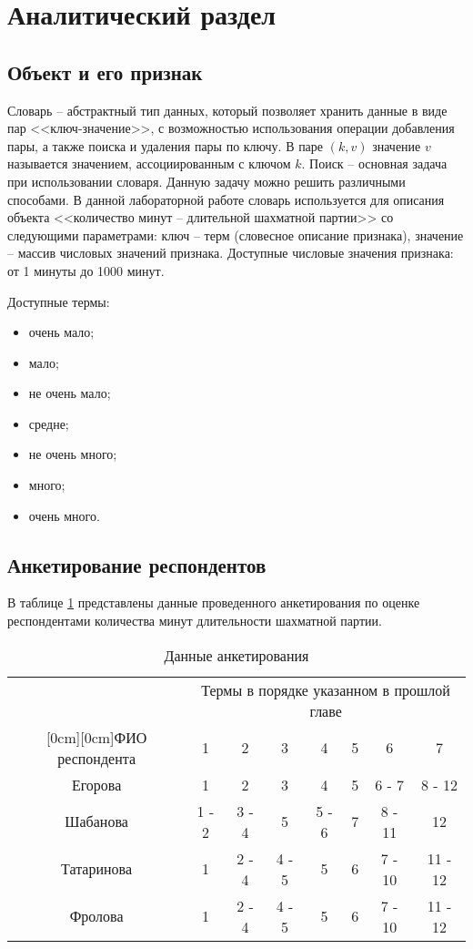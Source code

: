 \section{Аналитический раздел}

\subsection{Объект и его признак}
Словарь \cite{slov} -- абстрактный тип данных, который позволяет хранить данные в виде пар <<ключ-значение>>, с возможностью использования операции добавления пары, а также поиска и удаления пары по ключу. В паре $(k, v)$ значение $v$ называется значением, ассоциированным с ключом $ k $.
Поиск -- основная задача при использовании словаря. Данную задачу можно решить различными способами.
В данной лабораторной работе словарь используется для описания объекта <<количество минут -- длительной шахматной партии>> со следующими параметрами: ключ -- терм (словесное
описание признака), значение -- массив числовых значений признака. Доступные числовые значения признака: от 1 минуты до 1000 минут.

Доступные термы:
\begin{itemize}
	\item[1)] очень мало;
	\item[2)] мало;
	\item[3)] не очень мало;
	\item[4)] средне;
	\item[5)] не очень много;
	\item[6)] много;
	\item[7)] очень много.
\end{itemize}


\subsection{Анкетирование респондентов}
В таблице \ref{tbl:fio} представлены данные проведенного анкетирования по оценке респондентами количества минут длительности шахматной партии.

\begin{table}[h!]
	\captionsetup{justification=raggedright, singlelinecheck=off, margin*=33pt}
	\caption{\label{tbl:fio} Данные анкетирования}
	\begin{center}
		\begin{tabular}{|c|c|c|c|c|c|c|c|}
			\hline
			& \multicolumn{7}{c|}{Термы в порядке указанном в прошлой главе} \\
			\cline{2-8} 
			\raisebox{1.5ex}[0cm][0cm]{ФИО респондента}
			& 1 & 2 & 3 & 4 & 5 & 6 & 7 \\
			\hline
			Егорова & 1 & 2 & 3 & 4 & 5 & 6 - 7 & 8 - 12 \\
			\hline
			Шабанова   & 1 - 2 & 3 - 4 & 5 & 5 - 6 & 7 & 8 - 11 & 12 \\
			\hline
			Татаринова & 1 & 2 - 4 & 4 - 5 & 5 & 6 & 7 - 10 & 11 - 12 \\
			\hline
			Фролова & 1 & 2 - 4 & 4 - 5 & 5 & 6 & 7 - 10 & 11 - 12 \\
			\hline
		\end{tabular}
	\end{center}
\end{table}

